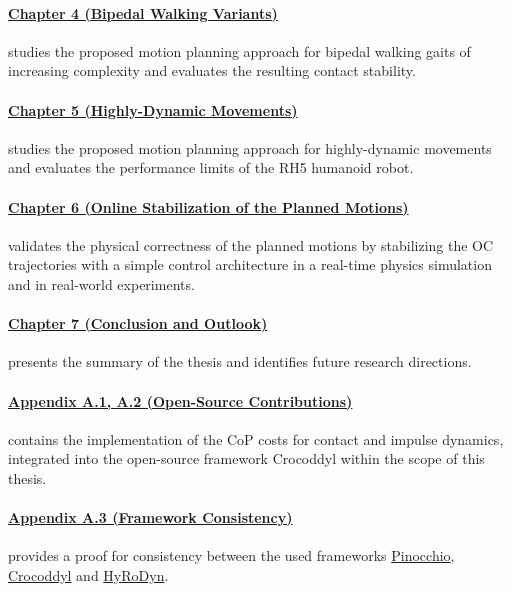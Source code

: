\paragraph{\hyperref[c4]{Chapter 4 (Bipedal Walking Variants)}} studies the proposed motion planning approach for bipedal walking gaits of increasing complexity and evaluates the resulting contact stability. 
\paragraph{\hyperref[c5]{Chapter 5 (Highly-Dynamic Movements)}} studies the proposed motion planning approach for highly-dynamic movements and evaluates the performance limits of the RH5 humanoid robot.
\paragraph{\hyperref[c6]{Chapter 6 (Online Stabilization of the Planned Motions)}} validates the physical correctness of the planned motions by stabilizing the \gls{OC} trajectories with a simple control architecture in a real-time physics simulation and in real-world experiments.
\paragraph{\hyperref[c7]{Chapter 7 (Conclusion and Outlook)}} presents the summary of the thesis and identifies future research directions. 
\paragraph{\hyperref[app:ContactCoP]{Appendix A.1, A.2 (Open-Source Contributions)}} contains the implementation of the \gls{CoP} costs for contact and impulse dynamics, integrated into the open-source framework Crocoddyl within the scope of this thesis. 
\paragraph{\hyperref[app:Consistency]{Appendix A.3 (Framework Consistency)}} provides a proof for consistency between the used frameworks \href{https://github.com/stack-of-tasks/pinocchio}{Pinocchio}, \href{https://github.com/loco-3d/crocoddyl#contact-robot-control-by-differential-dynamic-programming-library-crocoddyl}{Crocoddyl} and \href{https://robotik.dfki-bremen.de/en/research/softwaretools/hyrodyn/}{HyRoDyn}. 





















